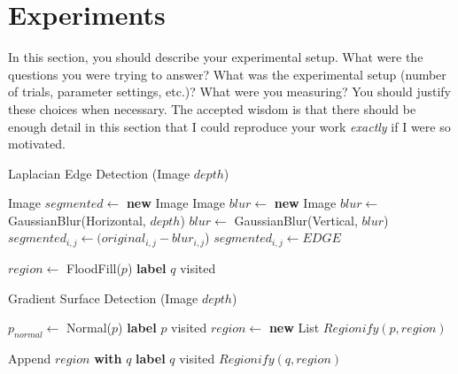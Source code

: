 
\section{Experiments}
\label{sec:expts}

In this section, you should describe your experimental setup. What
were the questions you were trying to answer? What was the
experimental setup (number of trials, parameter settings, etc.)? What
were you measuring? You should justify these choices when
necessary. The accepted wisdom is that there should be enough detail
in this section that I could reproduce your work \emph{exactly} if I
were so motivated.
\begin{algorithm}
\caption{Laplacian Edge Detection (Image $depth$)}\label{laplacian}
\begin{algorithmic}[1]
\State Image $segmented \gets$ \textbf{new} Image
\State Image  $blur \gets$ \textbf{new} Image
\State $blur \gets $ GaussianBlur(Horizontal, $depth$)
\State $blur \gets $ GaussianBlur(Vertical, $blur$)
\State $segmented_{i, j} \gets (original_{i, j}-blur_{i, j}$)
\State $segmented_{i,j} \gets EDGE$
\EndIf
\EndFor
\item[]
\State $region \gets$ FloodFill($p$) 
\State \textbf{label} $q$ visited
\EndFor
\EndIf
\EndFor
\State {}
\end{algorithmic}
\end{algorithm}


\begin{algorithm}
\caption{Gradient Surface Detection (Image $depth$)}\label{gradient}
\begin{algorithmic}[1]
\State $p_{normal} \gets$ Normal($p$) 
\EndFor
{}
\State \textbf{label} $p$ visited
\State $region \gets$ \textbf{new} List
\State$Regionify(p, region)$
\EndIf
\EndFor
\item[]
\State Append $region$ \textbf{with} $q$
\State \textbf{label} $q$ visited
\State $Regionify(q, region)$
\EndIf
\EndFor
\EndProcedure
\end{algorithmic}
\end{algorithm}
